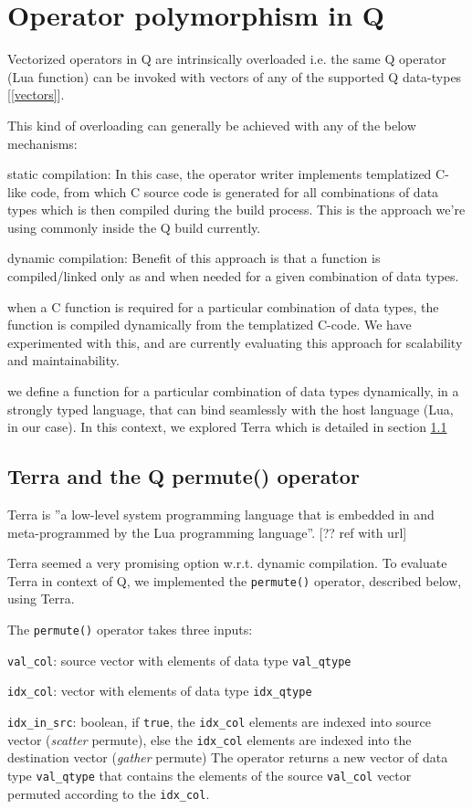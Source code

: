 \section{Operator polymorphism in Q}

Vectorized operators in Q are intrinsically overloaded i.e. the same Q operator (Lua function) can be invoked with vectors of any of the supported Q data-types [\ref{vectors}].

This kind of overloading can generally be achieved with any of the below mechanisms:
\be
\item static compilation: In this case, the operator writer implements templatized C-like code, from which C source code is generated for all combinations of data types which is then compiled during the build process. This is the approach we're using commonly inside the Q build currently.
\item dynamic compilation: Benefit of this approach is that a function is compiled/linked only as and when needed for a given combination of data types. 
\be
\item when a C function is required for a particular combination of data types, the function is compiled dynamically from the templatized C-code. We have experimented with this, and are currently evaluating this approach for scalability and maintainability.
\item we define a function for a particular combination of data types dynamically, in a strongly typed language, that can bind seamlessly with the host language (Lua, in our case).
In this context, we explored Terra which is detailed in section \ref{terra}
\ee
\ee

\subsection{Terra and the Q permute() operator} \label{terra}
Terra is ''a low-level system programming language that is embedded in and meta-programmed by the Lua programming language''. [?? ref with url] 

Terra seemed a very promising option w.r.t. dynamic compilation. To evaluate Terra in context of Q, we implemented the {\tt permute()} operator, described below, using Terra.

The {\tt permute()} operator takes three inputs:
\be
\item {\tt val\_col}: source vector with elements of data type {\tt val\_qtype}
\item {\tt idx\_col}: vector with elements of data type {\tt idx\_qtype}
\item {\tt idx\_in\_src}: boolean, if {\tt true}, the {\tt idx\_col} elements are indexed into source vector (\textit{scatter} permute), else the {\tt idx\_col} elements are indexed into the destination vector (\textit{gather} permute)
\ee
The operator returns a new vector of data type {\tt val\_qtype} that contains the elements of the source {\tt val\_col} vector permuted according to the {\tt idx\_col}.

